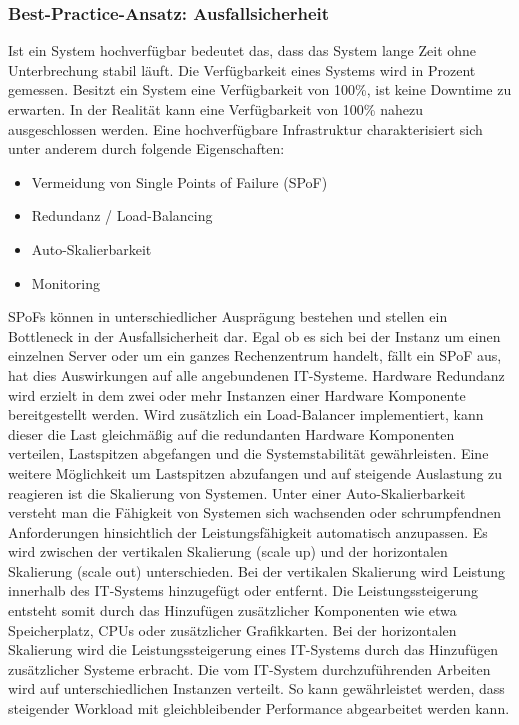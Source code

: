 \subsubsection{Best-Practice-Ansatz: Ausfallsicherheit}
Ist ein System \glqq{}hochverfügbar\grqq{} bedeutet das, dass das System lange Zeit ohne Unterbrechung stabil läuft. Die Verfügbarkeit eines Systems wird in Prozent gemessen. Besitzt ein System eine Verfügbarkeit von 100\%, ist keine Downtime zu erwarten. In der Realität kann eine Verfügbarkeit von 100\% nahezu ausgeschlossen werden. 
\bigbreak
Eine hochverfügbare Infrastruktur charakterisiert sich unter anderem durch folgende Eigenschaften:
\begin{itemize}
    \item Vermeidung von Single Points of Failure (SPoF)
    \item Redundanz / Load-Balancing
    \item Auto-Skalierbarkeit
    \item Monitoring
\end{itemize}
\bigbreak
SPoFs können in unterschiedlicher Ausprägung bestehen und stellen ein Bottleneck in der Ausfallsicherheit dar. Egal ob es sich bei der Instanz um einen einzelnen Server oder um ein ganzes Rechenzentrum handelt, fällt ein SPoF aus, hat dies Auswirkungen auf alle angebundenen IT-Systeme. 
\bigbreak
Hardware Redundanz wird erzielt in dem zwei oder mehr Instanzen einer Hardware Komponente bereitgestellt werden. Wird zusätzlich ein Load-Balancer implementiert, kann dieser die Last gleichmäßig auf die redundanten Hardware Komponenten verteilen, Lastspitzen abgefangen und die Systemstabilität gewährleisten. Eine weitere Möglichkeit um Lastspitzen abzufangen und auf steigende Auslastung zu reagieren ist die Skalierung von Systemen. Unter einer Auto-Skalierbarkeit versteht man die Fähigkeit von Systemen sich wachsenden oder schrumpfendnen Anforderungen hinsichtlich der Leistungsfähigkeit automatisch anzupassen. Es wird zwischen der vertikalen Skalierung (scale up) und der horizontalen Skalierung (scale out) unterschieden. Bei der vertikalen Skalierung wird Leistung innerhalb des IT-Systems hinzugefügt oder entfernt. Die Leistungssteigerung entsteht somit durch das Hinzufügen zusätzlicher Komponenten wie etwa Speicherplatz, CPUs oder zusätzlicher Grafikkarten. Bei der horizontalen Skalierung wird die Leistungssteigerung eines IT-Systems durch das Hinzufügen zusätzlicher Systeme erbracht. Die vom IT-System durchzuführenden Arbeiten wird auf unterschiedlichen Instanzen verteilt. So kann gewährleistet werden, dass steigender Workload mit gleichbleibender Performance abgearbeitet werden kann. \autocite{geißler_2019}
